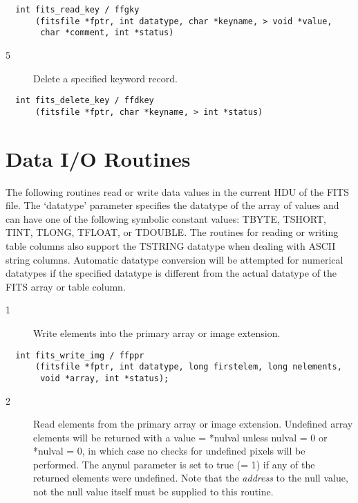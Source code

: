 \begin{verbatim}
  int fits_read_key / ffgky
      (fitsfile *fptr, int datatype, char *keyname, > void *value,
       char *comment, int *status)
\end{verbatim}

\begin{description}
\item[5 ] Delete a specified keyword record.
\end{description}

\begin{verbatim}
  int fits_delete_key / ffdkey
      (fitsfile *fptr, char *keyname, > int *status)
\end{verbatim}


\section{Data I/O Routines}

The following routines read or write data values in the current HDU of
the FITS file. The `datatype' parameter specifies the datatype of the
array of values and can have one of the following symbolic constant
values: TBYTE, TSHORT, TINT, TLONG, TFLOAT, or TDOUBLE.  The routines
for reading or writing table columns also support the TSTRING datatype
when dealing with ASCII string columns. Automatic datatype conversion
will be attempted for numerical datatypes if the specified datatype is
different from the actual datatype of the FITS array or table column.


\begin{description}
\item[1 ] Write elements into the primary array or image extension.
\end{description}

\begin{verbatim}
  int fits_write_img / ffppr
      (fitsfile *fptr, int datatype, long firstelem, long nelements,
       void *array, int *status);
\end{verbatim}

\begin{description}
\item[2 ] Read elements from the primary array or image extension.
    Undefined array elements will be returned with a value = *nulval
    unless nulval = 0 or *nulval = 0, in which case no checks
    for undefined pixels will be performed. The anynul parameter is
    set to true (= 1) if any of the returned
    elements were undefined. Note that the {\em address} to the
   null value, not the null value itself must be supplied to this routine.
\end{description}

